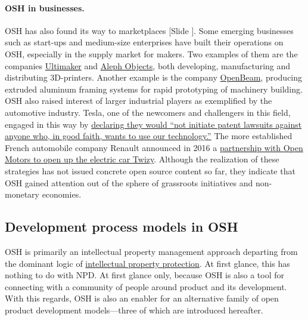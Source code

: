 \documentclass{article}
\newcounter{slide}
\begin{document}
\paragraph{OSH in businesses.} OSH has also found its way to marketplaces {\color{blue}[Slide ]}. Some emerging businesses such as start-ups and medium-size enterprises have built their operations on OSH, especially in the supply market for makers. Two examples of them are the companies \href{https://ultimaker.com/}{Ultimaker} and \href{https://www.alephobjects.com/}{Aleph Objects}, both developing, manufacturing and distributing 3D-printers. Another example is the company \href{https://ztautomations.com/openbeam/}{OpenBeam}, producing extruded aluminum framing systems for rapid prototyping of machinery building. OSH also raised interest of larger industrial players as exemplified by the automotive industry. Tesla, one of the newcomers and challengers in this field, engaged in this way by \href{https://www.tesla.com/blog/all-our-patent-are-belong-you}{declaring they would ``not initiate patent lawsuits against anyone who, in good faith, wants to use our technology.''} The more established French automobile company Renault announced in 2016 a \href{https://www.openmotors.co/renaultpomsignup/}{partnership with Open Motors to open up the electric car Twizy}. Although the realization of these strategies has not issued concrete open source content so far, they indicate that OSH gained attention out of the sphere of grassroots initiatives and non-monetary economies.

\subsection{Development process models in OSH}
\label{sec:dvppractices}

OSH is primarily an intellectual property management approach departing from the dominant logic of \href{https://en.wikipedia.org/wiki/Intellectual_property}{intellectual property protection}. At first glance, this has nothing to do with NPD. At first glance only, because OSH is also a tool for connecting with a community of people around product and its development. With this regards, OSH is also an enabler for an alternative family of open product development models---three of which are introduced hereafter.
\end{document}
